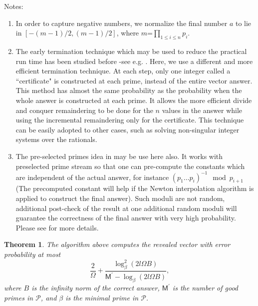 \documentclass{acm_proc_article-sp}
\newcommand{\reveal}{\ensuremath{\mbox{\tt likely\_image}}}
\newtheorem{theorem}{Theorem}
\newcommand{\pSize}{\ensuremath{\mathsf M}}
\newcommand{\rSize}{\ensuremath{\Omega}}
\newcommand{\set}{\ensuremath{\mathcal P}}
\newcommand{\minPrime}{\ensuremath{\beta}}
\newcommand{\length}{\ensuremath{\mathit l}}
\begin{document}
Notes:
\begin{enumerate}
\item
In order to capture negative numbers, 
we normalize the final number $a$ to lie in $[-(m-1)/2, (m-1)/2]$, 
where $m$=$\prod_{1\leq i \leq n} p_i$.
\item
The early termination technique which may be used to reduce 
the practical run time
has been studied before -see e.g. \cite{Emiris98,Kaltofen02, Eberly03}.
Here, we use a different and more efficient termination technique.
At each step, only one integer called a ``certificate" is constructed 
at each prime, instead of the entire vector answer. This method has almost
the same probability as the probability when the whole answer is constructed at each prime.  It allows the more efficient divide and conquer remaindering
to be done for the $n$ values in the answer while using the incremental
remaindering only for the certificate.
This technique can be easily adopted to other cases,
such as solving non-singular integer systems over the rationals.
\item
The pre-selected primes idea in \cite{Kaltofen02} may be use here also. 
It works with preselected prime stream %
so that one can pre-compute the constants 
which are independent of the actual answer,
for instance $(p_1 \ldots p_i)^{-1} \mod p_{i+1}$ (The precomputed constant 
will help if the Newton interpolation algorithm is applied to construct the
final answer). Such moduli are not random, additional post-check of the result
at one additional random moduli will guarantee the correctness of the final 
answer with very high probability. 
Please see \cite{Kaltofen02} for more details.
\end{enumerate}
\begin{theorem}
The algorithm above computes the revealed vector with error probability at most 
\[\frac{2}{\rSize} +
\frac{\log^2_{\minPrime}(2\length \rSize B)}
{\pSize^\prime - \log_{\minPrime}(2\length \rSize B)},\]
where $B$ is the infinity norm of the correct answer,
$\pSize^\prime$ is the number of good primes in $\set$,
and $\minPrime$ is the minimal prime in $\set$.
\end{theorem}
\end{document}
